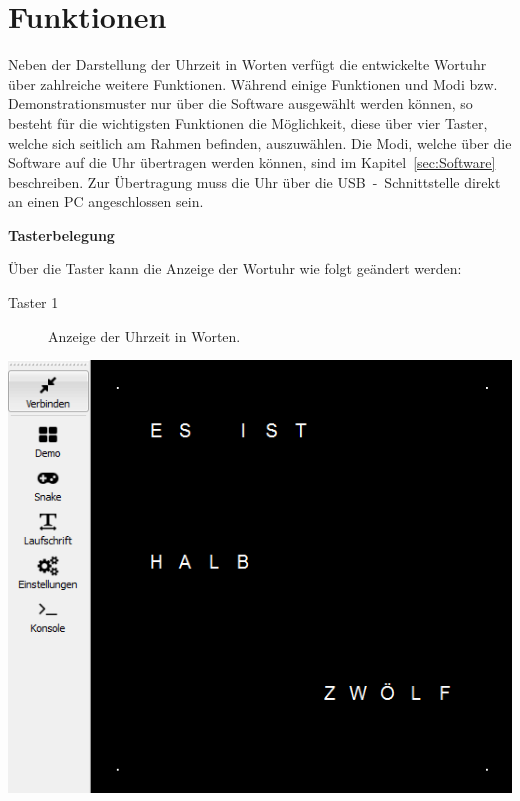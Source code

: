 
\section{Funktionen}
\label{sec:Funktionen}

\begin{multicols}{2}

Neben der Darstellung der Uhrzeit in Worten verfügt die entwickelte Wortuhr über zahlreiche weitere Funktionen. Während einige Funktionen und Modi bzw. Demonstrationsmuster nur über die Software ausgewählt werden können, so besteht für die wichtigsten Funktionen die Möglichkeit, diese über vier Taster, welche sich seitlich am Rahmen befinden, auszuwählen. Die Modi, welche über die Software auf die Uhr übertragen werden können, sind im Kapitel~\ref{sec:Software} beschreiben. Zur Übertragung muss die Uhr über die USB~-~Schnittstelle direkt an einen PC angeschlossen sein. 

 \textbf{Tasterbelegung}
 
 Über die Taster kann die Anzeige der Wortuhr wie folgt geändert werden:
\begin{description}
\item[Taster 1] Anzeige der Uhrzeit in Worten.
\end {description}
{
\centering
\includegraphics[width=0.8\columnwidth]{Abbildungen/Funktionen/Uhrzeit_01}

}


\end{multicols}
